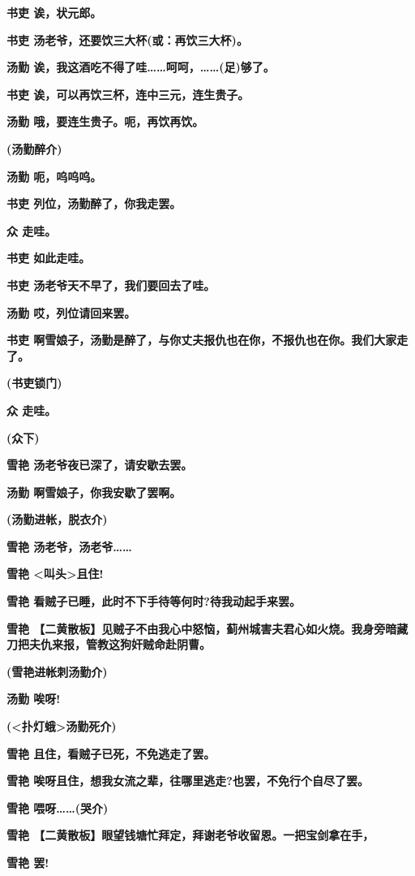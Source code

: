 \textbf{书吏 诶，状元郎。}

\textbf{书吏 汤老爷，还要饮三大杯(或：再饮三大杯)。}

\textbf{汤勤
诶，我这酒吃不得了哇\ldots{}\ldots{}呵呵，\ldots{}\ldots{}(足)够了。}

\textbf{书吏 诶，可以再饮三杯，连中三元，连生贵子。}

\textbf{汤勤 哦，要连生贵子。呃，再饮再饮。}

\textbf{(汤勤醉介)}

\textbf{汤勤 呃，呜呜呜。}

\textbf{书吏 列位，汤勤醉了，你我走罢。}

\textbf{众 走哇。}

\textbf{书吏 如此走哇。}

\textbf{书吏 汤老爷天不早了，我们要回去了哇。}

\textbf{汤勤 哎，列位请回来罢。}

\textbf{书吏
啊雪娘子，汤勤是醉了，与你丈夫报仇也在你，不报仇也在你。我们大家走了。}

\textbf{(书吏锁门)}

\textbf{众 走哇。}

\textbf{(众下)}

\textbf{雪艳 汤老爷夜已深了，请安歇去罢。}

\textbf{汤勤 啊雪娘子，你我安歇了罢啊。}

\textbf{(汤勤进帐，脱衣介)}

\textbf{雪艳 汤老爷，汤老爷\ldots{}\ldots{}}

\textbf{雪艳 \textless{}叫头\textgreater{}且住!}

\textbf{雪艳 看贼子已睡，此时不下手待等何时?待我动起手来罢。}

\textbf{雪艳
【二黄散板】见贼子不由我心中怒恼，蓟州城害夫君心如火烧。我身旁暗藏刀把夫仇来报，管教这狗奸贼命赴阴曹。}

\textbf{(雪艳进帐刺汤勤介)}

\textbf{汤勤 唉呀!}

\textbf{(\textless{}扑灯蛾\textgreater{}汤勤死介)}

\textbf{雪艳 且住，看贼子已死，不免逃走了罢。}

\textbf{雪艳
唉呀且住，想我女流之辈，往哪里逃走?也罢，不免行个自尽了罢。}

\textbf{雪艳 喂呀\ldots{}\ldots{}(哭介)}

\textbf{雪艳
【二黄散板】眼望钱塘忙拜定，拜谢老爷收留恩。一把宝剑拿在手，}

\textbf{雪艳 罢!}

